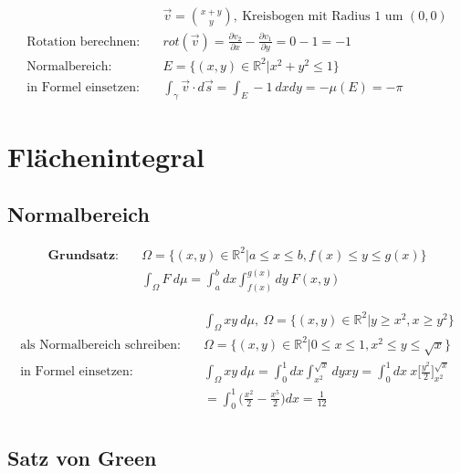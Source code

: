 \documentclass[11pt]{article}
\begin{document}
\begin{equation*}
\begin{split}
	& \vec{v} = \binom{x+y}{y},\ \text{Kreisbogen mit Radius $1$ um $(0,0)$} \\
	\text{Rotation berechnen:}\quad & rot(\vec{v}) = \frac{\partial v_2}{\partial x}-\frac{\partial v_1}{\partial y} = 0 -1 = -1 \\
	\text{Normalbereich:}\quad & E = \{(x,y) \in \mathbb{R}^2 | x^2 + y^2 \leq 1 \} \\
	\text{in Formel einsetzen:}\quad & \int_\gamma \vec{v} \cdot d\vec{s} = \int_E -1\ dxdy = -\mu(E) = -\pi
\end{split}
\end{equation*}

\section{Fl{\"a}chenintegral}

\subsection{Normalbereich}

\begin{equation*}
\begin{split}
	\textbf{Grundsatz:}\quad & \Omega = \{(x,y) \in \mathbb{R}^2| a \leq x \leq b, f(x) \leq y \leq g(x)\} \\
	& \int_\Omega F\ d\mu = \int_a^b dx \int_{f(x)}^{g(x)} dy\ F(x,y)
\end{split}
\end{equation*}

\begin{equation*}
\begin{split}
	& \int_\Omega xy\ d\mu,\ \Omega = \{(x,y) \in \mathbb{R}^2| y \geq x^2, x \geq y^2 \} \\
	\text{als Normalbereich schreiben:}\quad & \Omega = \{(x,y) \in \mathbb{R}^2| 0 \leq x \leq 1, x^2 \leq y \leq \sqrt{x}\} \\
	\text{in Formel einsetzen:}\quad & \int_\Omega xy\ d\mu = \int_0^1 dx\int_{x^2}^{\sqrt{x}} dyxy = \int_0^1 dx\ x \Big[\frac{y^2}{2}\Big]_{x^2}^{\sqrt{x}} \\
	& = \int_0^1 \Big(\frac{x^2}{2}-\frac{x^5}{2}\Big)dx = \frac{1}{12} \\
\end{split}
\end{equation*}

\subsection{Satz von Green}
\end{document}
